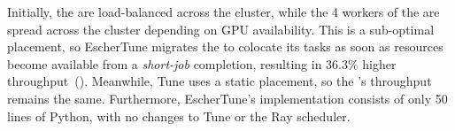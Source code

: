 Initially, the \shortjobs{} are load-balanced across the cluster, while the 4 workers of the \longjob{} are spread across the cluster depending on GPU availability. This is a sub-optimal placement, so EscherTune migrates the \longjob{} to colocate its tasks as soon as resources become available from a \emph{short-job} completion, resulting in 36.3\% higher throughput~().
Meanwhile, Tune uses a static placement, so the \longjob{}'s throughput remains the same.
Furthermore, EscherTune's implementation consists of only 50 lines of Python, with no changes to Tune or the Ray scheduler. %
 



